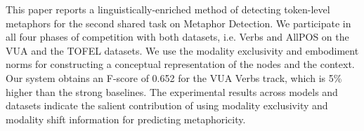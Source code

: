 This paper reports a linguistically-enriched method of detecting token-level metaphors for the second shared task on Metaphor Detection. We participate in all four phases of competition with both datasets, i.e. Verbs and AllPOS on the VUA and the TOFEL datasets. We use the modality exclusivity and embodiment norms for constructing a conceptual representation of the nodes and the context. Our system obtains an F-score of 0.652 for the VUA Verbs track, which is 5\% higher than the strong baselines. The experimental results across models and datasets indicate the salient contribution of using modality exclusivity and modality shift information for predicting metaphoricity.
